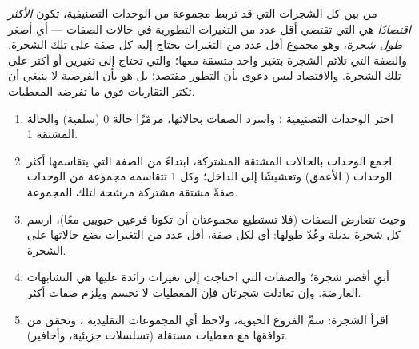 \begin{definition}[الاقتصاد]\label{def:b1:classifying-biodiversity:parsimony}
من بين كل الشجرات التي قد تربط مجموعة من الوحدات التصنيفية، تكون
\emph{الأكثر اقتصادًا} هي التي تقتضي أقل عدد من التغيرات
التطورية في حالات الصفات --- أي أصغر \emph{طول شجرة}، وهو
مجموع أقل عدد من التغيرات يحتاج إليه كل صفة على
تلك الشجرة. والصفة التي تلائم الشجرة بتغير واحد
متسقة معها؛ والتي تحتاج إلى تغيرين أو أكثر  على
تلك الشجرة. والاقتصاد ليس دعوى بأن التطور مقتصد؛ بل
هو  بأن الفرضية لا ينبغي أن تكثر التقاربات
فوق ما تفرضه المعطيات.
\end{definition}

\begin{method}\label{met:b1:classifying-biodiversity:cladogram}
\begin{enumerate}
  \item اختر الوحدات التصنيفية ؛ واسرد الصفات بحالاتها،
        مرمّزًا حالة  0 (سلفية)
        والحالة المشتقة 1.
  \item اجمع الوحدات بالحالات المشتقة المشتركة، ابتداءً من
        الصفة التي يتقاسمها أكثر الوحدات ( الأعمق)
        وتعشيشًا إلى الداخل؛ وكل 1 تتقاسمه مجموعة من الوحدات
        صفةٌ مشتقة مشتركة مرشحة لتلك المجموعة.
  \item وحيث تتعارض الصفات (فلا تستطيع مجموعتان أن تكونا
        فرعين حيويين معًا)، ارسم كل شجرة بديلة وعُدّ طولها:
        أي لكل صفة، أقل عدد من التغيرات يضع حالاتها
        على الشجرة.
  \item أبقِ أقصر شجرة؛ والصفات التي احتاجت إلى تغيرات
        زائدة عليها هي التشابهات العارضة. وإن تعادلت شجرتان فإن
        المعطيات لا تحسم ويلزم صفات أكثر.
  \item اقرأ الشجرة: سمِّ الفروع الحيوية، ولاحظ أي المجموعات التقليدية
        ، وتحقق من توافقها مع معطيات مستقلة
        (تسلسلات جزيئية، وأحافير).
\end{enumerate}
\end{method}

